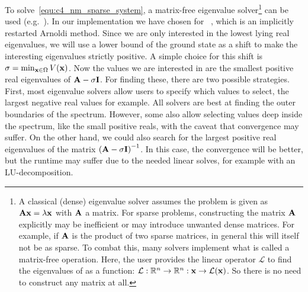 
To solve~\eqref{equ:c4_nm_sparse_system}, a matrix-free eigenvalue solver\footnote{A classical (dense) eigenvalue solver assumes the problem is given as $\vb{A} \vb{x} = \lambda \vb{x}$ with $\vb{A}$ a matrix. For sparse problems, constructing the matrix $\vb{A}$ explicitly may be inefficient or may introduce unwanted dense matrices. For example, if $\vb{A}$ is the product of two sparse matrices, in general this will itself not be as sparse. To combat this, many solvers implement what is called a matrix-free operation. Here, the user provides the linear operator $\mathcal{L}$ to find the eigenvalues of as a function: $\mathcal{L} : \mathbb{R}^n \to \mathbb{R}^n : \vb{x} \to \mathcal{L}(\vb{x})$. So there is no need to construct any matrix at all.} can be used (e.g.~\cite{lehoucq_arpack_1998,hernandez_slepc_2005,qiu_spectra_2022}). In our implementation we have chosen for \spectra{}~\cite{qiu_spectra_2022}, which is an implicitly restarted Arnoldi method. Since we are only interested in the lowest lying real eigenvalues, we will use a lower bound of the ground state as a shift to make the interesting eigenvalues strictly positive. A simple choice for this shift is $\sigma = \min_{\vb{x} \in \Omega} V(\vb{x})$. Now the values we are interested in are the smallest positive real eigenvalues of $\vb{A} - \sigma \vb{I}$. For finding these, there are two possible strategies. First, most eigenvalue solvers allow users to specify which values to select, the largest negative real values for example. All solvers are best at finding the outer boundaries of the spectrum. However, some also allow selecting values deep inside the spectrum, like the small positive reals, with the caveat that convergence may suffer. On the other hand, we could also search for the largest positive real eigenvalues of the matrix $\left(\vb{A} - \sigma \vb{I}\right)^{-1}$. In this case, the convergence will be better, but the runtime may suffer due to the needed linear solves, for example with an LU-decomposition.

